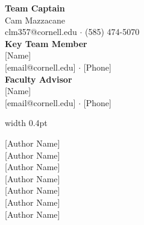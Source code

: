 \documentclass{tmsce}
\begin{document}
\vspace{0.6cm}
\noindent
\begin{minipage}[t]{0.48\textwidth}
  \small
  \textbf{Team Captain}\\
  {Cam Mazzacane}\\
  {\footnotesize clm357@cornell.edu $\cdot$ (585) 474-5070}\\[0.7em]
  \textbf{Key Team Member}\\
  {[Name]}\\
  {\footnotesize [email@cornell.edu] $\cdot$ [Phone]}\\[0.7em]
  \textbf{Faculty Advisor}\\
  {[Name]}\\
  {\footnotesize [email@cornell.edu] $\cdot$ [Phone]}
\end{minipage}%
\hfill
\vrule width 0.4pt
\hfill
\begin{minipage}[t]{0.44\textwidth}
  \small
  {[Author Name]}\\[0.3em]
  {[Author Name]}\\[0.3em]
  {[Author Name]}\\[0.3em]
  {[Author Name]}\\[0.3em]
  {[Author Name]}\\[0.3em]
  {[Author Name]}\\[0.3em]
  {[Author Name]}
\end{minipage}

\restoregeometry
\newpage

\thispagestyle{empty}
\tableofcontents

\newpage

\setcounter{page}{1}
\twocolumn[{\vspace{0.5em}}]










\end{document}
